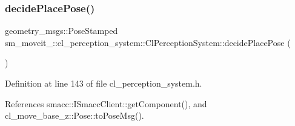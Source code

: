 \subsubsection{\texorpdfstring{decide\+Place\+Pose()}{decidePlacePose()}}
{\footnotesize\ttfamily geometry\+\_\+msgs\+::\+Pose\+Stamped sm\+\_\+moveit\+\_\+::cl\+\_\+perception\+\_\+system\+::\+Cl\+Perception\+System\+::decide\+Place\+Pose (\begin{DoxyParamCaption}{ }\end{DoxyParamCaption})\hspace{0.3cm}{\ttfamily [inline]}}



Definition at line 143 of file cl\+\_\+perception\+\_\+system.\+h.



References smacc\+::\+I\+Smacc\+Client\+::get\+Component(), and cl\+\_\+move\+\_\+base\+\_\+z\+::\+Pose\+::to\+Pose\+Msg().


